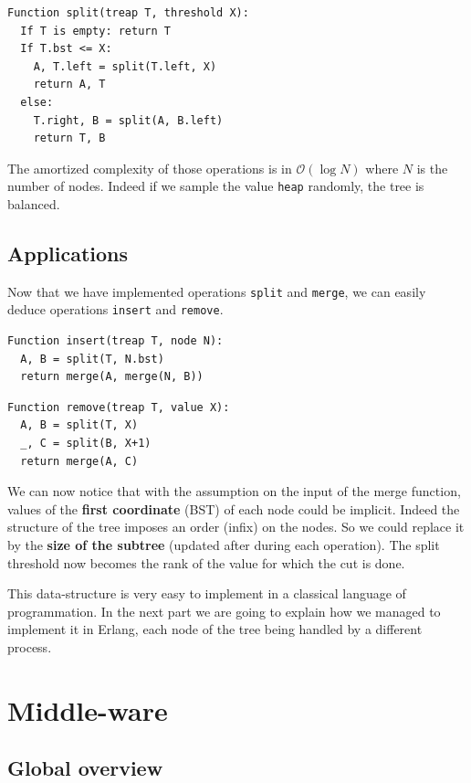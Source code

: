 \documentclass[a4paper, 11pt]{article}
\begin{document}
\begin{verbatim}
Function split(treap T, threshold X):
  If T is empty: return T
  If T.bst <= X:
    A, T.left = split(T.left, X)
    return A, T
  else:
    T.right, B = split(A, B.left)
    return T, B
\end{verbatim}

The amortized complexity of those operations is in $\mathcal O(\log N)$ where $N$ is the number of nodes. Indeed if we sample the value \verb|heap| randomly, the tree is balanced.

\newpage
\subsection{Applications}

Now that we have implemented operations \verb|split| and \verb|merge|, we can easily deduce operations \verb|insert| and \verb|remove|.

\begin{verbatim}
Function insert(treap T, node N):
  A, B = split(T, N.bst)
  return merge(A, merge(N, B))
\end{verbatim} 

\begin{verbatim}
Function remove(treap T, value X):
  A, B = split(T, X)
  _, C = split(B, X+1)
  return merge(A, C)
\end{verbatim} 

We can now notice that with the assumption on the input of the merge function, values of the \textbf{first coordinate} (BST) of each node could be implicit. Indeed the structure of the tree imposes an order (infix) on the nodes. So we could replace it by the \textbf{size of the subtree} (updated after during each operation). The split threshold now becomes the rank of the value for which the cut is done.

\medskip This data-structure is very easy to implement in a classical language of programmation. In the next part we are going to explain how we managed to implement it in Erlang, each node of the tree being handled by a different process.

\newpage

\section{Middle-ware}

\subsection{Global overview}
\end{document}
